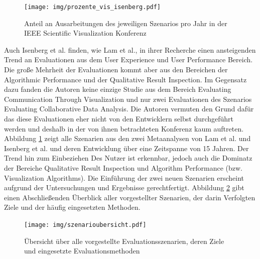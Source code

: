 \documentclass[draft=false
              ,paper=a4
              ,twoside=false
              ,fontsize=11pt
              ,headsepline
              ,BCOR10mm
              ,DIV11
              ]{scrbook}
\begin{document}
\begin{figure}[htbp]
  \centering
  \texttt{[image: img/prozente\_vis\_isenberg.pdf]}
  \caption{Anteil an Ausarbeitungen des jeweiligen Szenarios pro Jahr in der IEEE Scientific Visualization Konferenz}
  \label{fig:szenarien2}
\end{figure}

Auch Isenberg et al. finden, wie Lam et al., in ihrer Recherche einen ansteigenden Trend an Evaluationen aus dem User Experience und User Performance Bereich. Die große Mehrheit der Evaluationen kommt aber aus den Bereichen der Algorithmic Performance und der Qualitative Result Inspection. Im Gegensatz dazu fanden die Autoren keine einzige Studie aus dem Bereich Evaluating Communication Through Visualization und nur zwei Evaluationen des Szenarios Evaluating Collaborative Data Analysis. Die Autoren vermuten den Grund dafür das diese Evaluationen eher nicht von den Entwicklern selbst durchgeführt werden und deshalb in der von ihnen betrachteten Konferenz kaum auftreten. Abbildung \ref{fig:szenarien2} zeigt alle Szenarien aus den zwei Metaanalysen von Lam et al. und Isenberg et al. und deren Entwicklung über eine Zeitspanne von 15 Jahren. Der Trend hin zum Einbeziehen Des Nutzer ist erkennbar, jedoch auch die Dominatz der Bereiche Qualitative Result Inspection und Algorithm Performance (bzw. Visualization Algorithms). Die Einführung der zwei neuen Szenarien erscheint aufgrund der Untersuchungen und Ergebnisse gerechtfertigt. Abbildung \ref{fig:szenarienübersicht} gibt einen Abschließenden Überblick aller vorgestellter Szenarien, der darin Verfolgten Ziele und der häufig eingesetzten Methoden.

\begin{figure}[htbp]
  \centering
  \texttt{[image: img/szenarioubersicht.pdf]}
  \caption{Übersicht über alle vorgestellte Evaluationsszenarien, deren Ziele und eingesetzte Evaluationsmethoden}
  \label{fig:szenarienübersicht}
\end{figure}

\end{document}
